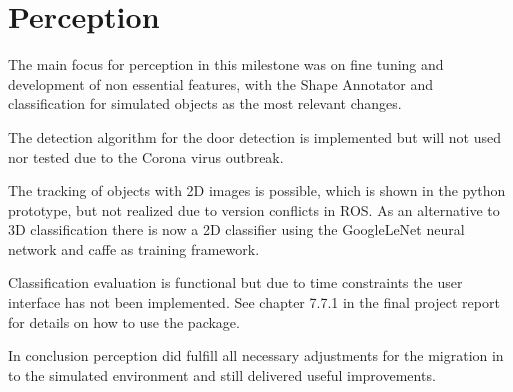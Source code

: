 \documentclass[main.tex]{subfiles}
\begin{document}
	
	\chapter{Perception}
	
The main focus for perception in this milestone was on fine tuning and development of non essential features, with the Shape Annotator and classification for simulated objects as the most relevant changes.

The detection algorithm for the door detection is implemented but will not used nor tested due to the Corona virus outbreak.

The tracking of objects with 2D images is possible, which is shown in the python prototype, but not realized due to version conflicts in ROS.
As an alternative to 3D classification there is now a 2D classifier using the GoogleLeNet neural network and caffe as training framework.

Classification evaluation is functional but due to time constraints the user interface has not been implemented. See chapter 7.7.1 in the final project report for details on how to use the package.

In conclusion perception did fulfill all necessary adjustments for the migration in to the simulated environment and still delivered useful improvements.

	
\end{document}
